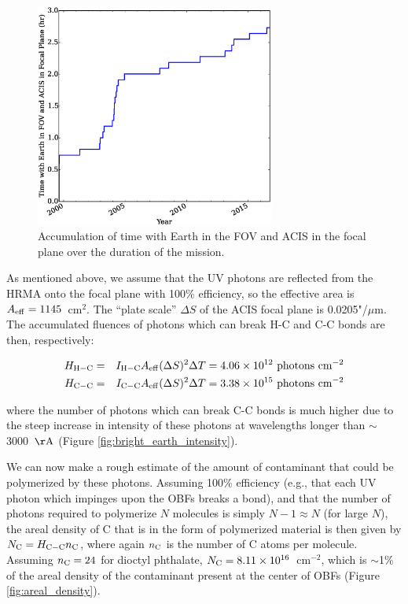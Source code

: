 \documentclass[11pt]{article}
\begin{document}
\begin{figure}
\begin{center}
\includegraphics[width=0.7\textwidth]{time_accum.eps}
\caption{Accumulation of time with Earth in the FOV and ACIS in the focal plane over the duration of the mission.\label{fig:time_accum}}
\end{center}
\end{figure}

As mentioned above, we assume that the UV photons are reflected from the HRMA onto the focal plane with 100\% efficiency, so the effective area is $A_{\rm eff} = 1145$~cm$^2$. The ``plate scale'' $\Delta{S}$ of the ACIS focal plane is 0.0205"/$\mu$m. The accumulated fluences of photons which can break H-C and C-C bonds are then, respectively:

\begin{eqnarray}
H_{\rm H-C} &=& I_{\rm H-C}A_{\rm eff}(\Delta{S})^2\Delta{T} = 4.06 \times 10^{12}~{\rm photons~cm^{-2}} \\
H_{\rm C-C} &=& I_{\rm C-C}A_{\rm eff}(\Delta{S})^2\Delta{T} = 3.38 \times 10^{15}~{\rm photons~cm^{-2}}\label{eqn:fluence}
\end{eqnarray}

\noindent
where the number of photons which can break C-C bonds is much higher due to the steep increase in intensity of these photons
at wavelengths longer than $\sim$3000~${\rm \AA}$ (Figure \ref{fig:bright_earth_intensity}).

We can now make a rough estimate of the amount of contaminant that could be polymerized by these photons. Assuming 100\%
efficiency (e.g., that each UV photon which impinges upon the OBFs breaks a bond), and that the number of photons required
to polymerize $N$ molecules is simply $N-1 \approx N$ (for large $N$), the areal density of C that is in the form of
polymerized material is then given by $N_{\rm C} = H_{\rm C-C}n_{\rm C}$, where again $n_{\rm C}$ is the number of C atoms per
molecule. Assuming $n_{\rm C} = 24$ for dioctyl phthalate, $N_{\rm C} = 8.11 \times 10^{16}$~cm$^{-2}$, which is $\sim$1\%
of the areal density of the contaminant present at the center of OBFs (Figure \ref{fig:areal_density}).
\end{document}
